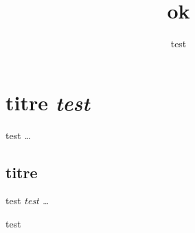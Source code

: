 \author{test}
\title{ok}
\date{}


\maketitle

\section{titre \textit{test}}

test \textit{\ldots}

\subsection{titre}

test \textit{test \ldots}

test



